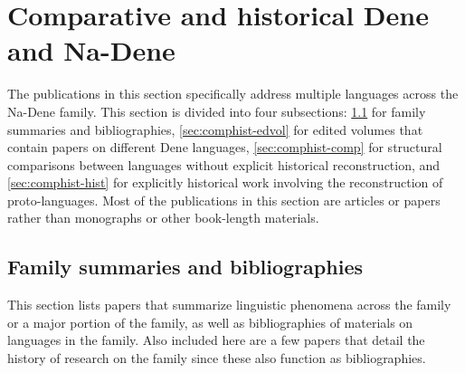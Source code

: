 \documentclass[12pt,letterpaper,oneside,article]{memoir}
\begin{document}
\section{Comparative and historical Dene and Na-Dene}\label{sec:comphist}

The publications in this section specifically address multiple languages across the Na-Dene family.
This section is divided into four subsections:
\ref{sec:comphist-sum} for family summaries and bibliographies,
\ref{sec:comphist-edvol} for edited volumes that contain papers on different Dene languages,
\ref{sec:comphist-comp} for structural comparisons between languages without explicit historical reconstruction,
and \ref{sec:comphist-hist} for explicitly historical work involving the reconstruction of proto-languages.
Most of the publications in this section are articles or papers rather than monographs or other book-length materials.

\subsection{Family summaries and bibliographies}\label{sec:comphist-sum}

This section lists papers that summarize linguistic phenomena across the family or a major portion of the family, as well as bibliographies of materials on languages in the family.
Also included here are a few papers that detail the history of research on the family since these also function as bibliographies.
\end{document}
